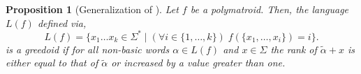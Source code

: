 \documentclass[11pt]{article}
\newtheorem{proposition}[theorem]{Proposition}
\newcommand{\univ}{\Sigma}
\begin{document}
\iffalse
\begin{proposition}[Generalization of \cite{korte1985polymatroid}]\label{thm:pnat<->fibr}
    Let $f$ be a polymatroid.
    Then, the language $L(f)$ defined via,
    \[ 
        L(f) = \{x_1\ldots x_k\in\univ^*\mid (\forall i \in \{1,\ldots,k\})\;f(\{x_1,\ldots,x_i\}) = i\}.
    \]
    is a greedoid if for all non-basic words $\alpha \in L(f)$ and $x \in \univ$ the rank of $\widetilde{\alpha} + x$ is either equal to that of $\widetilde{\alpha}$ or increased by a value greater than one.
\end{proposition}
\end{document}
